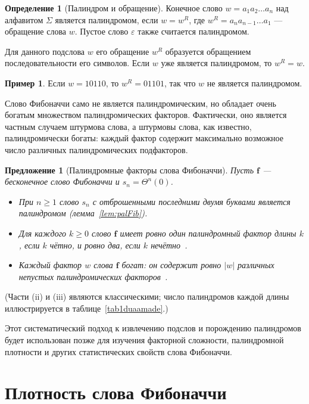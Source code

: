 \documentclass[a4paper,14pt]{extreport}
\theoremstyle{plain}
\newtheorem{proposition}[theorem]{Предложение}
\theoremstyle{definition}
\newtheorem{definition}{Определение}[section]
\newtheorem{example}{Пример}
\theoremstyle{remark}
\begin{document}
\begin{definition}[Палиндром и обращение]
	Конечное слово $w = a_1 a_2 \ldots a_n$ над алфавитом $\Sigma$ является палиндромом, если $w = w^R$, где $w^R = a_n a_{n-1} \ldots a_1$ --- обращение слова $w$. Пустое слово $\varepsilon$ также считается палиндромом.
\end{definition}

Для данного подслова $w$ его обращение $w^R$ образуется обращением последовательности его символов. Если $w$ уже является палиндромом, то $w^R = w$.

\begin{example}
	Если $w = 10110$, то $w^R = 01101$, так что $w$ не является палиндромом.
\end{example}

Слово Фибоначчи само не является палиндромическим, но обладает очень богатым множеством палиндромических факторов. Фактически, оно является частным случаем штурмова слова, а штурмовы слова, как известно, палиндромически богаты: каждый фактор содержит максимально возможное число различных палиндромических подфакторов.

\begin{proposition}[Палиндромные факторы слова Фибоначчи]
	Пусть $\mathbf f$ --- бесконечное слово Фибоначчи и $s_n=\Theta^n(0)$.
	\begin{itemize}
		\item[(i)] При $n\ge1$ слово $s_n$ с отброшенными последними двумя буквами является палиндромом (лемма~\ref{lem:palFib}).
		\item[(ii)] Для каждого $k\ge0$ слово $\mathbf f$ имеет ровно один палиндромный фактор длины $k$, если $k$ чётно, и ровно два, если $k$ нечётно~\cite{DroubayX}.
		\item[(iii)] Каждый фактор $w$ слова $\mathbf f$ богат: он содержит ровно $|w|$ различных непустых палиндромических факторов~\cite{Droubay}.
	\end{itemize}
\end{proposition}
\noindent (Части (ii) и (iii) являются классическими; число палиндромов каждой длины иллюстрируется в таблице~\ref{tab1duaamade}.)

Этот систематический подход к извлечению подслов и порождению палиндромов будет использован позже для изучения факторной сложности, палиндромной плотности и других статистических свойств слова Фибоначчи.
\section{Плотность слова Фибоначчи}~\label{sec3.4}
\end{document}
